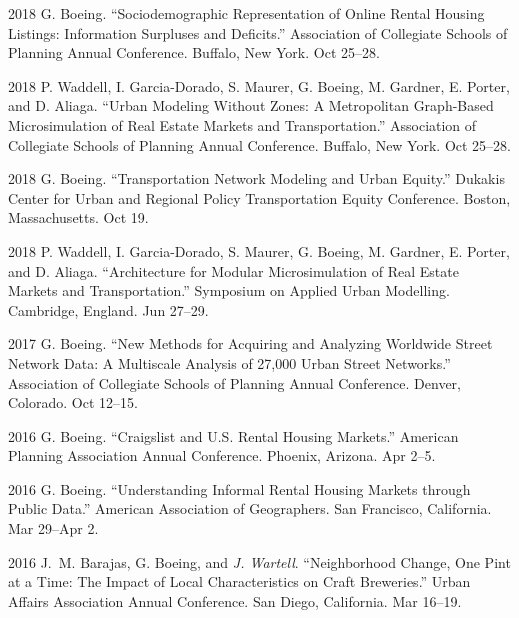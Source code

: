 \documentclass[11pt,letterpaper]{report}
\begin{document}
\begin{tablist}
        \item[2018] \tab{}G. Boeing. \enquote{Sociodemographic Representation of Online Rental Housing Listings: Information Surpluses and Deficits.} Association of Collegiate Schools of Planning Annual Conference. Buffalo, New York. Oct 25--28.

        \item[2018] \tab{}P. Waddell, I. Garcia-Dorado, S. Maurer, G. Boeing, M. Gardner, E. Porter, and D. Aliaga. \enquote{Urban Modeling Without Zones: A Metropolitan Graph-Based Microsimulation of Real Estate Markets and Transportation.} Association of Collegiate Schools of Planning Annual Conference. Buffalo, New York. Oct 25--28.

        \item[2018] \tab{}G. Boeing. \enquote{Transportation Network Modeling and Urban Equity.} Dukakis Center for Urban and Regional Policy Transportation Equity Conference. Boston, Massachusetts. Oct 19.

        \item[2018] \tab{}P. Waddell, I. Garcia-Dorado, S. Maurer, G. Boeing, M. Gardner, E. Porter, and D. Aliaga. \enquote{Architecture for Modular Microsimulation of Real Estate Markets and Transportation.} Symposium on Applied Urban Modelling. Cambridge, England. Jun 27--29.

        \item[2017] \tab{}G. Boeing. \enquote{New Methods for Acquiring and Analyzing Worldwide Street Network Data: A Multiscale Analysis of 27,000 Urban Street Networks.} Association of Collegiate Schools of Planning Annual Conference. Denver, Colorado. Oct 12--15.

        \item[2016] \tab{}G. Boeing. \enquote{Craigslist and U.S. Rental Housing Markets.} American Planning Association Annual Conference. Phoenix, Arizona. Apr 2--5.

        \item[2016] \tab{}G. Boeing. \enquote{Understanding Informal Rental Housing Markets through Public Data.} American Association of Geographers. San Francisco, California. Mar 29--Apr 2.

        \item[2016] \tab{}J.~M. Barajas, G. Boeing, and \textit{J. Wartell}. \enquote{Neighborhood Change, One Pint at a Time: The Impact of Local Characteristics on Craft Breweries.} Urban Affairs Association Annual Conference. San Diego, California. Mar 16--19.


\end{tablist}
\end{document}
